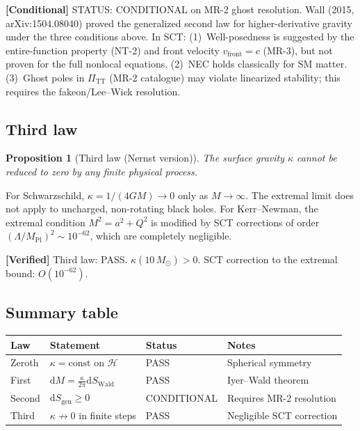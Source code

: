 \documentclass[11pt,a4paper]{article}
\renewcommand{\dd}{\mathrm{d}}
\newcommand{\PiTT}{\Pi_{\mathrm{TT}}}
\newcommand{\MP}{M_{\mathrm{Pl}}}
\theoremstyle{plain}
\newtheorem{proposition}[theorem]{Proposition}
\theoremstyle{definition}
\newcommand{\verified}[1]{%
  \par\smallskip\noindent
  \colorbox{green!10}{\parbox{\dimexpr\linewidth-2\fboxsep}{%
    \textcolor{green!50!black}{\textbf{[Verified]}} #1}}%
  \par\smallskip}
\newcommand{\conditional}[1]{%
  \par\smallskip\noindent
  \colorbox{yellow!15}{\parbox{\dimexpr\linewidth-2\fboxsep}{%
    \textcolor{yellow!50!black}{\textbf{[Conditional]}} #1}}%
  \par\smallskip}
\begin{document}
\conditional{STATUS: CONDITIONAL on MR-2 ghost resolution.
Wall (2015, arXiv:1504.08040) proved the generalized second law for
higher-derivative gravity under the three conditions above. In SCT:
(1)~Well-posedness is suggested by the entire-function property (NT-2)
and front velocity $v_{\mathrm{front}} = c$ (MR-3), but not proven for
the full nonlocal equations.
(2)~NEC holds classically for SM matter.
(3)~Ghost poles in $\PiTT$ (MR-2 catalogue) may violate linearized
stability; this requires the fakeon/Lee--Wick resolution.}

\subsection{Third law}

\begin{proposition}[Third law (Nernst version)]\label{prop:third}
The surface gravity $\kappa$ cannot be reduced to zero by any finite
physical process.
\end{proposition}

For Schwarzschild, $\kappa = 1/(4GM) \to 0$ only as $M \to \infty$.
The extremal limit does not apply to uncharged, non-rotating black holes.
For Kerr--Newman, the extremal condition $M^2 = a^2 + Q^2$ is modified
by SCT corrections of order $(\Lambda/\MP)^2 \sim 10^{-62}$, which are
completely negligible.

\verified{Third law: PASS. $\kappa(10\,M_\odot) > 0$. SCT correction
to the extremal bound: $O(10^{-62})$.}

\subsection{Summary table}

\begin{center}
\begin{tabular}{llll}
\toprule
Law & Statement & Status & Notes \\
\midrule
Zeroth & $\kappa = \mathrm{const}$ on $\mathcal{H}$ & PASS & Spherical symmetry \\
First & $\dd M = \frac{\kappa}{2\pi}\dd S_{\mathrm{Wald}}$ & PASS & Iyer--Wald theorem \\
Second & $\dd S_{\mathrm{gen}} \geq 0$ & CONDITIONAL & Requires MR-2 resolution \\
Third & $\kappa \not\to 0$ in finite steps & PASS & Negligible SCT correction \\
\bottomrule
\end{tabular}
\end{center}
\end{document}
